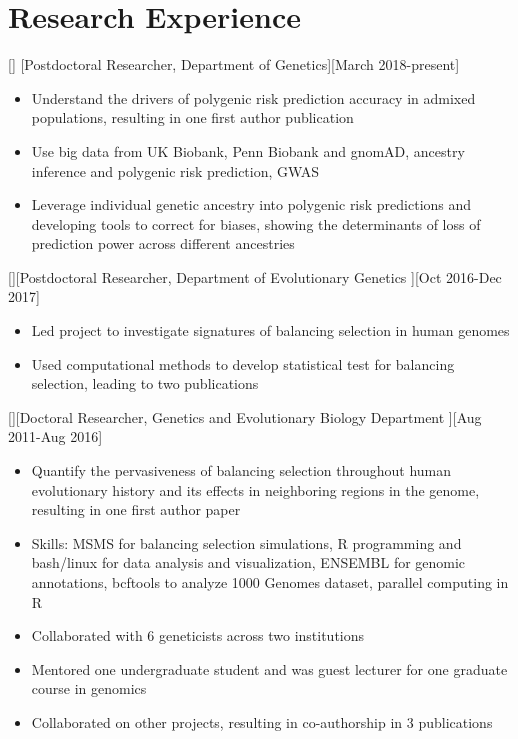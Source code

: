 \documentclass{article}
\begin{document}
\section{Research Experience}

[]
[Postdoctoral Researcher, Department of Genetics][March 2018-present]

\begin{itemize}
\item Understand the drivers of polygenic risk prediction accuracy in admixed populations, resulting in one first author publication
\item Use big data from UK Biobank, Penn Biobank and gnomAD, ancestry inference and polygenic risk prediction, GWAS
\item Leverage individual genetic ancestry into polygenic risk predictions and developing tools to correct for biases, showing the determinants of loss of prediction power across different ancestries
\end{itemize}

[][Postdoctoral Researcher, Department of Evolutionary Genetics ][Oct 2016-Dec 2017]

\begin{itemize}
\item Led project to investigate signatures of balancing selection in human genomes
\item Used computational methods to develop statistical test for balancing selection, leading to two publications
\end{itemize}

[][Doctoral Researcher, Genetics and Evolutionary Biology Department ][Aug 2011-Aug 2016]
\begin{itemize}
    \item Quantify the pervasiveness of balancing selection throughout human evolutionary history and its effects in neighboring regions in the genome, resulting in one first author paper
    \item Skills: MSMS for balancing selection simulations, R programming and bash/linux for data analysis and visualization, ENSEMBL for genomic annotations, bcftools to analyze 1000 Genomes dataset, parallel computing in R
    \item Collaborated with 6 geneticists across two institutions
    \item Mentored one undergraduate student and was guest lecturer for one graduate course in genomics
    \item Collaborated on other projects, resulting in co-authorship in 3 publications
\end{itemize}
\end{document}
